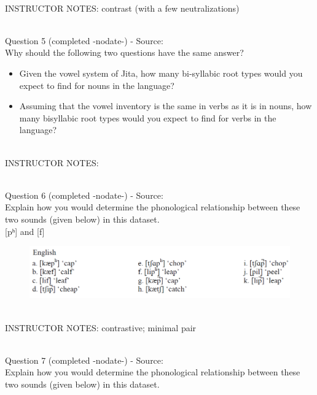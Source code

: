\documentclass[12pt]{article}
\begin{document}
~\\
INSTRUCTOR NOTES: contrast (with a few neutralizations)


~\\

{\large Question 5} (completed -nodate-) - Source: \\

Why should the following two questions have the same answer?\\

\begin{itemize} \item Given the vowel system of Jita, how many bi-syllabic root types would you expect to find for nouns in the language? \item Assuming that the vowel inventory is the same in verbs as it is in nouns, how many bisyllabic root types would you expect to find for verbs in the language? \end{itemize}


~\\
INSTRUCTOR NOTES: 


~\\

{\large Question 6} (completed -nodate-) - Source: \\

Explain how you would determine the phonological relationship between these two sounds (given below) in this dataset.\\

{[pʰ]} and {[f]}

\begin{figure}[H]
\includegraphics{../images/english_labials.png}
\end{figure}

~\\
INSTRUCTOR NOTES: contrastive; minimal pair


~\\

{\large Question 7} (completed -nodate-) - Source: \\

Explain how you would determine the phonological relationship between these two sounds (given below) in this dataset.\\
\end{document}

